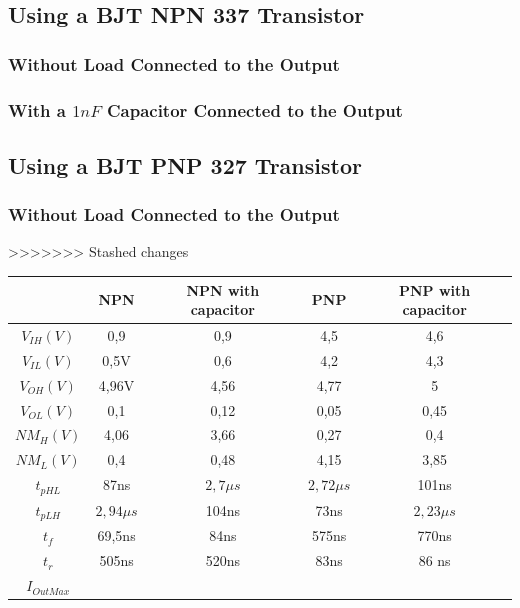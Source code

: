 \documentclass[a4paper,11pt]{report}
\begin{document}
\subsection{\color{purple}Using a BJT NPN 337 Transistor}

\subsubsection{\color{red}Without Load Connected to the Output}

\subsubsection{\color{red}With a $1 nF$ Capacitor Connected to the Output}


\subsection{\color{purple}Using a BJT PNP 327 Transistor}

\subsubsection{\color{red}Without Load Connected to the Output}

>>>>>>> Stashed changes

\begin{tabular}{|c|c|c|c|c|}
\hline
 & NPN & NPN with capacitor &PNP& PNP with capacitor\\
\hline
\hline
$V_{IH} (V)$ & 0,9 & 0,9 & 4,5 & 4,6  \\
\hline
$V_{IL} (V)$ & 0,5V & 0,6 & 4,2 & 4,3 \\
\hline
$V_{OH} (V)$ & 4,96V & 4,56 & 4,77 & 5 \\
\hline
$V_{OL} (V)$ & 0,1 & 0,12 & 0,05 & 0,45\\ 
\hline
$NM_{H} (V) $ & 4,06 & 3,66 & 0,27 & 0,4\\ %
\hline
$NM_{L} (V) $ & 0,4 & 0,48 & 4,15 & 3,85 \\  %
\hline
$t_{pHL}$ & 87ns & $2,7\mu s $ &  $2,72\mu s$ & 101ns \\
\hline
$t_{pLH}$ & $2,94\mu s$ &  104ns &  73ns &  $2,23\mu s$\\
\hline
$t_{f}$ & 69,5ns & 84ns & 575ns & 770ns\\
\hline
$t_{r}$ & 505ns & 520ns & 83ns & 86 ns\\
\hline
$ I_{Out{Max}}$ &   &   &   &   \\ %
\hline
\end{tabular}
\end{document}
